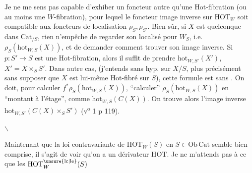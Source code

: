 
Je ne me sens pas capable d'exhiber un foncteur autre qu'une Hot-fibration (ou  au moins une $W$-fibration), pour lequel le foncteur image inverse sur $\mathrm{HOT}_W$ soit compatible aux foncteurs de localisation $\rho_S,\rho_{S'}$. Bien sûr, si $X$ est quelconque dans $\mathrm{Cat}_{/S}$, rien n'empêche de regarder son localisé pour $W_S$, i.e. $\rho_S(\mathrm{hot}_{W,S}(X))$, et de  demander comment trouver son image inverse. Si $p:S'\longrightarrow S$ est une Hot-fibration, alors il suffit de prendre $\mathrm{hot}_{W,S'}(X')$, $X'=X\times_S S'$. Dans  autre cas, (j'entends sans hyp. sur $X/S$,  plus précisément sans supposer que $X$ est lui-même Hot-fibré sur $S$), cette formule est  sans . On doit, pour calculer $f^*\rho_S(\mathrm{hot}_{W,S}(X))$, ``calculer'' $\rho_S(\mathrm{hot}_{W,S}(X))$ en ``montant à l'étage'', comme $\mathrm{hot}_{W,S}(C(X))$. On trouve alors l'image inverse $\mathrm{hot}_{W,S'}(C(X)\times_S S')$ (v\textsuperscript{o}  1 p 119).

\centerline{\(\backslash\)}

Maintenant que la loi contravariante de $\mathrm{HOT}_W(S)$ en $S\in\mathrm{Ob}\,\mathrm{Cat}$ semble bien comprise, il s'agit de voir qu'on a  un dérivateur $\mathrm{HOT}$. Je ne m'attends pas à ce que les $\mathrm{HOT}^{\unsure{\mathrm{lc}|\mathrm{le}}}_W(S)$
